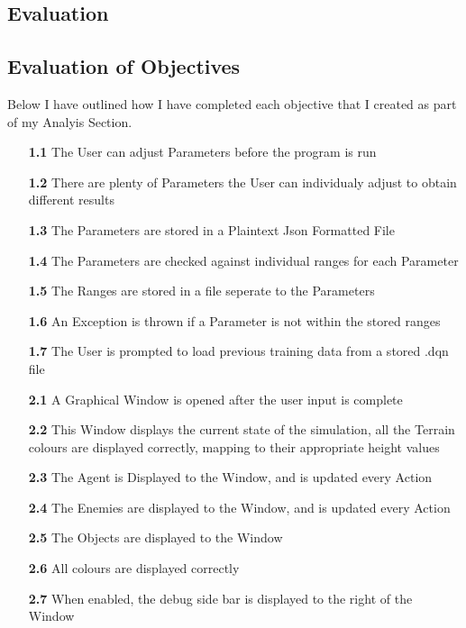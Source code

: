 \begin{flushleft}
    \section{Evaluation}
    \large
    \subsection{Evaluation of Objectives} 
        Below I have outlined how I have completed each objective that I created as part of my Analyis Section.

        \begin{itemize}
            \item[\textbf{1.1}] The User can adjust Parameters before the program is run
            \item[\textbf{1.2}] There are plenty of Parameters the User can individualy adjust to obtain different results
            \item[\textbf{1.3}] The Parameters are stored in a Plaintext Json Formatted File
            \item[\textbf{1.4}] The Parameters are checked against individual ranges for each Parameter
            \item[\textbf{1.5}] The Ranges are stored in a file seperate to the Parameters
            \item[\textbf{1.6}] An Exception is thrown if a Parameter is not within the stored ranges
            \item[\textbf{1.7}] The User is prompted to load previous training data from a stored .dqn file 
            \item[\textbf{2.1}] A Graphical Window is opened after the user input is complete
            \item[\textbf{2.2}] This Window displays the current state of the simulation, all the Terrain colours are displayed correctly, mapping to their appropriate height values
            \item[\textbf{2.3}] The Agent is Displayed to the Window, and is updated every Action
            \item[\textbf{2.4}] The Enemies are displayed to the Window, and is updated every Action
            \item[\textbf{2.5}] The Objects are displayed to the Window
            \item[\textbf{2.6}] All colours are displayed correctly
            \item[\textbf{2.7}] When enabled, the debug side bar is displayed to the right of the Window

\end{itemize}
\end{flushleft}
